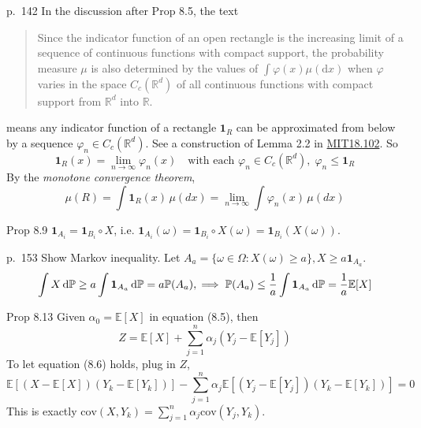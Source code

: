 \begin{note}{p.~142}
    In the discussion after Prop 8.5, the text
    \begin{quote}
        Since the indicator function of an open rectangle is the increasing limit of a sequence of continuous functions with compact support, the probability measure \( \mu \) is also determined by the values of \( \int \varphi(x) \mu(\mathrm{d} x) \) when \( \varphi \) varies in the space \( C_{c}\left(\mathbb{R}^{d}\right) \) of all continuous functions with compact support from \( \mathbb{R}^{d} \) into \( \mathbb{R} \). 
    \end{quote}
    means any indicator function of a rectangle $\mathbf{1}_R$ can be approximated from below by a sequence $\varphi_n\in C_c(\mathbb{R}^d)$. See a construction of Lemma 2.2 in \href{https://ocw.mit.edu/courses/18-102-introduction-to-functional-analysis-spring-2021/3d4cc88026d44a01f936cd6a0aa995cb_MIT18_102s20_lec_FA.pdf}{MIT18.102}. So
    \[
    \mathbf{1}_R(x) = \lim_{n \to \infty} \varphi_n(x) \quad \text{with each } \varphi_n \in C_c(\mathbb{R}^d), \; \varphi_n \leq \mathbf{1}_R
    \]
    By the \emph{monotone convergence theorem},
    $$
    \mu(R) = \int \mathbf{1}_R(x) \, \mu(dx) = \lim_{n \to \infty} \int \varphi_n(x) \, \mu(dx)
    $$
\end{note}

\begin{note}{Prop 8.9}
    $\mathbf{1}_{A_i}=\mathbf{1}_{B_i}\circ X$, i.e. $\mathbf{1}_{A_i}(\omega)=\mathbf{1}_{B_i}\circ X(\omega)=\mathbf{1}_{B_i}(X(\omega))$. 
\end{note}

\begin{note}{p.~153}
    Show Markov inequality. Let $A_a=\{\omega\in\Omega: X(\omega)\ge a\}, X\ge a\mathbf{1}_{A_a}.$ 
    \[
    \int X\mathop{}\!\mathrm{d} \mathbb{P}\ge a\int\mathbf{1}_{A_a}\mathop{}\!\mathrm{d} \mathbb{P}=a\mathbb{P}(A_a),\implies \mathbb{P}(A_a)\le\frac{1}{a}\int\mathbf{1}_{A_a}\mathop{}\!\mathrm{d} \mathbb{P}=\frac{1}{a}\mathbb{E}[X]
    \]
\end{note}

\begin{note}{Prop 8.13}
    Given $\alpha_0=\mathbb{E}[X]$ in equation (8.5), then 
    \[
    Z=\mathbb{E}[X]+\sum_{j=1}^n \alpha_j (Y_j-\mathbb{E}[Y_j])
    \]
    To let equation (8.6) holds, plug in $Z$,
    \[
    \mathbb{E}[(X-\mathbb{E}[X])(Y_k-\mathbb{E}[Y_k])]-\sum_{j=1}^n \alpha_j \mathbb{E}[(Y_j-\mathbb{E}[Y_j])(Y_k-\mathbb{E}[Y_k])]=0
    \]
    This is exactly $\text{cov}(X,Y_k)=\sum_{j=1}^n \alpha_j\text{cov}(Y_j,Y_k)$.
\end{note}

